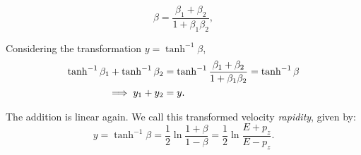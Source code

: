 \begin{equation}
	\beta = \frac{\beta_1 + \beta_2}{1 + \beta_1\beta_2},
\end{equation}

Considering the transformation \(y = \tanh^{-1}\beta\), 
\begin{align}
	\tanh^{-1}\beta_1 + \tanh^{-1}\beta_2 &= \tanh^{-1}  \frac{\beta_1 + \beta_2}{1 + \beta_1\beta_2} = \tanh^{-1}\beta\notag\\
	\implies y_1 + y_2 &= y.
\end{align}

The addition is linear again.  We call this transformed velocity \emph{rapidity}, given by:
\begin{equation}
	y = \tanh^{-1}\beta = \frac{1}{2} \ln \frac{1 + \beta}{1 - \beta}  = \frac{1}{2} \ln \frac{E + p_z}{E - p_z}.
	\label{eq:rapy}
\end{equation}

